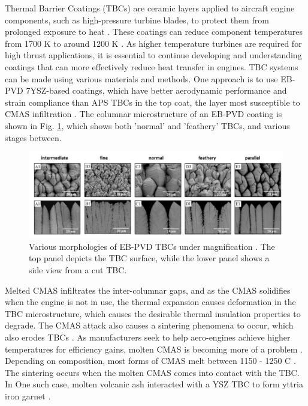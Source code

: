 \documentclass[conf]{new-aiaa}
\begin{document}
Thermal Barrier Coatings (TBCs) are ceramic layers applied to aircraft engine components, such as high-pressure turbine blades, to protect them from prolonged exposure to heat \cite{Bennett2005}. These coatings can reduce component temperatures from 1700 K to around 1200 K \cite{Sirigiri2018}. As higher temperature turbines are required for high thrust applications, it is essential to continue developing and understanding coatings that can more effectively reduce heat transfer in engines. TBC systems can be made using various materials and methods. One approach is to use EB-PVD 7YSZ-based coatings, which have better aerodynamic performance and strain compliance than APS TBCs in the top coat, the layer most susceptible to CMAS infiltration \cite{Renteria2007}. The columnar microstructure of an EB-PVD coating is shown in Fig. \ref{Fig1}, which shows both 'normal' and 'feathery' TBCs, and various stages between.

\begin{figure}[htp!]
\centering
\includegraphics[width=.9\textwidth]{Figures/Fig1.png}
\caption{Various morphologies of EB-PVD TBCs under magnification \cite{Renteria2007}. The top panel depicts the TBC surface, while the lower panel shows a side view from a cut TBC. }
\label{Fig1}
\end{figure}

Melted CMAS infiltrates the inter-columnar gaps, and as the CMAS solidifies when the engine is not in use, the thermal expansion causes deformation in the TBC microstructure, which causes the desirable thermal insulation properties to degrade. The CMAS attack also causes a sintering phenomena to occur, which also erodes TBCs \cite{Peng2012}. As manufacturers seek to help aero-engines achieve higher temperatures for efficiency gains, molten CMAS is becoming more of a problem \cite{Boyce2012}. Depending on composition, most forms of CMAS melt between 1150 - 1250 \degree C \cite{Costa2019,Naraparaju2014,Wellman2010,Kramer2006}. The sintering occurs when the molten CMAS comes into contact with the TBC. In One such case, molten volcanic ash interacted with a YSZ TBC to form yttria iron garnet \cite{Xia2019}.
\end{document}
